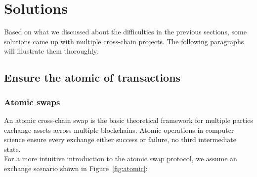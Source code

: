 \section{Solutions}
\label{sec:sol}
\noindent Based on what we discussed about the difficulties in the previous sections, some solutions came up with multiple cross-chain projects. The following paragraphs will illustrate them thoroughly.
\subsection{Ensure the atomic of transactions}

\subsubsection{Atomic swaps}
\noindent An atomic cross-chain swap\cite{herlihy2018atomic} is the basic theoretical framework for multiple parties exchange assets across multiple blockchains. Atomic operations in computer science ensure every exchange either success or failure, no third intermediate state.\\
\noindent For a more intuitive introduction to the atomic swap protocol, we assume an exchange scenario shown in Figure~\ref{fig:atomic}:

